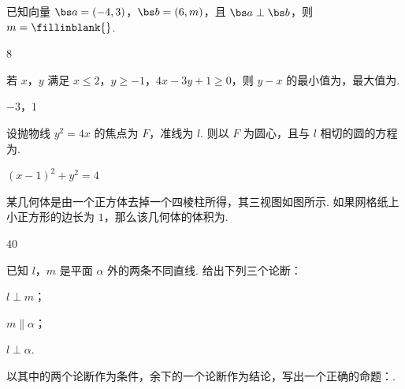 \begin{problem}
已知向量 \(\bs a=(-4,3)\)，\(\bs b=(6,m)\)，且 \(\bs a\perp\bs b\)，则 \(m=\fillinblank{}\).
\end{problem}

\begin{answer}
\(8\)
\end{answer}

\begin{problem}
若 \(x\)，\(y\) 满足 \(x\le2\)，\(y\ge-1\)，\(4x-3y+1\ge0\)，则 \(y-x\) 的最小值为\fillinblank{}，最大值为\fillinblank{}.
\end{problem}

\begin{answer}
\(-3\)，\(1\)
\end{answer}

\begin{problem}
设抛物线 \(y^2=4x\) 的焦点为 \(F\)，准线为 \(l\). 则以 \(F\) 为圆心，且与 \(l\) 相切的圆的方程为\fillinblank{}.
\end{problem}

\begin{answer}
\((x-1)^2+y^2=4\)
\end{answer}

\begin{problem}
某几何体是由一个正方体去掉一个四棱柱所得，其三视图如图所示. 如果网格纸上小正方形的边长为 \(1\)，那么该几何体的体积为\fillinblank{}.

\end{problem}

\begin{answer}
\(40\)
\end{answer}

\begin{problem}
已知 \(l\)，\(m\) 是平面 \(\alpha\) 外的两条不同直线. 给出下列三个论断：

\begin{circlelist}
\item \(l\perp m\)；

\item \(m\parallel\alpha\)；

\item \(l\perp \alpha\).
\end{circlelist}

以其中的两个论断作为条件，余下的一个论断作为结论，写出一个正确的命题：\fillinblank{}.
\end{problem}

